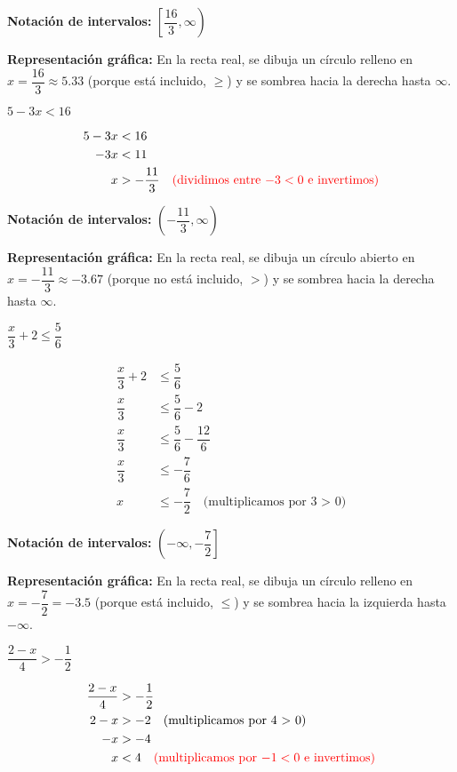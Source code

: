 \begin{exercise}
\begin{solucion}
\textbf{Notación de intervalos:} $\left[\dfrac{16}{3}, \infty\right)$

\textbf{Representación gráfica:} En la recta real, se dibuja un círculo relleno en $x = \dfrac{16}{3} \approx 5.33$ (porque está incluido, $\ge$) y se sombrea hacia la derecha hasta $\infty$.
\end{solucion}

\problem $5 - 3x < 16$

\begin{solucion}
\begin{align*}
5 - 3x &< 16 \\
-3x &< 11 \\
x &> -\dfrac{11}{3} \quad \textcolor{red}{\text{(dividimos entre $-3 < 0$ e invertimos)}}
\end{align*}

\textbf{Notación de intervalos:} $\left(-\dfrac{11}{3}, \infty\right)$

\textbf{Representación gráfica:} En la recta real, se dibuja un círculo abierto en $x = -\dfrac{11}{3} \approx -3.67$ (porque no está incluido, $>$) y se sombrea hacia la derecha hasta $\infty$.
\end{solucion}

\problem $\dfrac{x}{3} + 2 \le \dfrac{5}{6}$

\begin{solucion}
\begin{align*}
\dfrac{x}{3} + 2 &\le \dfrac{5}{6} \\
\dfrac{x}{3} &\le \dfrac{5}{6} - 2 \\
\dfrac{x}{3} &\le \dfrac{5}{6} - \dfrac{12}{6} \\
\dfrac{x}{3} &\le -\dfrac{7}{6} \\
x &\le -\dfrac{7}{2} \quad \text{(multiplicamos por 3 > 0)}
\end{align*}

\textbf{Notación de intervalos:} $\left(-\infty, -\dfrac{7}{2}\right]$

\textbf{Representación gráfica:} En la recta real, se dibuja un círculo relleno en $x = -\dfrac{7}{2} = -3.5$ (porque está incluido, $\le$) y se sombrea hacia la izquierda hasta $-\infty$.
\end{solucion}

\problem $\dfrac{2 - x}{4} > -\dfrac{1}{2}$

\begin{solucion}
\begin{align*}
\dfrac{2 - x}{4} &> -\dfrac{1}{2} \\
2 - x &> -2 \quad \text{(multiplicamos por 4 > 0)} \\
-x &> -4 \\
x &< 4 \quad \textcolor{red}{\text{(multiplicamos por $-1 < 0$ e invertimos)}}
\end{align*}


\end{solucion}
\end{exercise}
